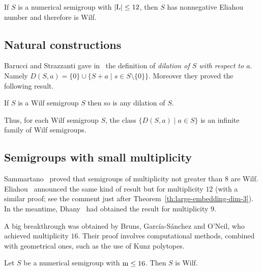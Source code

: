 \begin{proposition}\label{prop:L<=12}
	If $S$ is a numerical semigroup with $\left|\operatorname{L}\right|\le 12$, then $S$ has nonnegative Eliahou number and therefore is Wilf. 
\end{proposition}

\subsection{Natural constructions}
Barucci and Strazzanti gave in~\cite{BarucciStrazzanti2018SF-Dilatations} the definition of \emph{dilation of $S$ with respect to $a$}. Namely $D(S,a)=\{0\}\cup \{S+a\mid s\in S\setminus\{0\}\}$. Moreover they proved the following result.
\begin{proposition}\label{prop:dilations}
	If $S$ is a Wilf semigroup $S$ then so is any dilation of $S$.
\end{proposition}

Thus, for each Wilf semigroup $S$, the class $\{D(S,a)\mid a\in S\}$ is an infinite family of Wilf semigroups.

\subsection{Semigroups with small multiplicity}\label{sec:small-multiplicity}
Sammartano~\cite[Cor.~19]{Sammartano2012SF-Numerical} proved that semigroups of multiplicity not greater than $8$ are Wilf. Eliahou~\cite{Eliahou2017-Umea} announced the same kind of result but for multiplicity $12$ (with a similar proof; see the comment just after Theorem~\ref{th:large-embedding-dim-3}). In the meantime, Dhany~\cite[Cor.~4.10]{Dhayni2018PJM-Wilfs} had obtained the result for multiplicity $9$.

A big breakthrough was obtained by Bruns, García-Sánchez and O'Neil, who achieved multiplicity $16$. Their proof involves computational methods, combined with geometrical ones, such as the use of Kunz polytopes.  
\begin{proposition}\label{prop:mult-16}
	Let $S$ be a numerical semigroup with $\operatorname{m}\le 16$. Then $S$ is Wilf.
\end{proposition}


